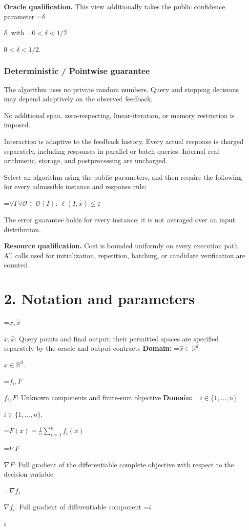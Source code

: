 \documentclass[10pt,a4paper]{article}
\newcommand{\AtlasMath}[1]{\par\begingroup\centering\setbox0=\hbox{$\displaystyle #1$}\ifdim\wd0>1.4\linewidth\typeout{ATLAS WIDE FORMULA: \the\wd0}\fi\ifdim\wd0>\linewidth\resizebox{\linewidth}{!}{\box0}\else\box0\fi\par\endgroup}
\newcommand{\AtlasInlineMath}[1]{\begingroup\setbox0=\hbox{$#1$}\ifdim\wd0>.4\linewidth\endgroup\AtlasMath{#1}\else\endgroup$#1$\fi}
\begin{document}
\textbf{Oracle qualification.} This view additionally takes the public confidence parameter \AtlasInlineMath{\delta}, with \AtlasInlineMath{0<\delta<1/2}.

\subsubsection{Deterministic / Pointwise guarantee}
The algorithm uses no private random numbers. Query and stopping decisions may depend adaptively on the observed feedback.

No additional span, zero-respecting, linear-iteration, or memory restriction is imposed.

Interaction is adaptive to the feedback history. Every actual response is charged separately, including responses in parallel or batch queries. Internal real arithmetic, storage, and postprocessing are uncharged.

Select an algorithm using the public parameters, and then require the following for every admissible instance and response rule:


\AtlasMath{\forall I\,\forall\mathcal{O}\in\mathcal{O}(I):\ \ell(I,\widehat{x})\le\varepsilon}


The error guarantee holds for every instance; it is not averaged over an input distribution.

\textbf{Resource qualification.} Cost is bounded uniformly on every execution path. All calls used for initialization, repetition, batching, or candidate verification are counted.

\section{2. Notation and parameters}
\AtlasInlineMath{x,\widehat{x}}: Query points and final output; their permitted spaces are specified separately by the oracle and output contracts \textbf{Domain:} \AtlasInlineMath{\widehat{x}\in \mathbb{R}^d}.

\AtlasInlineMath{f_i,F}: Unknown components and finite-sum objective \textbf{Domain:} \AtlasInlineMath{i\in\{1,\ldots,n\}}.


\AtlasMath{F(x)=\frac1n\sum_{i=1}^n f_i(x)}


\AtlasInlineMath{\nabla F}: Full gradient of the differentiable complete objective with respect to the decision variable

\AtlasInlineMath{\nabla f_i}: Full gradient of differentiable component \AtlasInlineMath{i}
\end{document}
